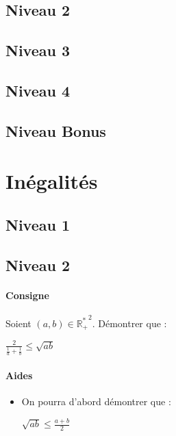 \documentclass[a4paper]{report}
\begin{document}
			\subsection{Niveau 2}
		
			\subsection{Niveau 3}
			
			\subsection{Niveau 4}
			
			\subsection{Niveau Bonus}
	
		\section{Inégalités}	
		
			\subsection{Niveau 1}
		
			\subsection{Niveau 2}
			\begin{tcolorbox}[colback=white,colframe=black,title=Exercice - Inégalités et fractions]
				\paragraph{Consigne}
						Soient $(a,b) \in \mathbb{R_+^*}^2$. Démontrer que :
						\begin{center}
							$\frac{2}{\frac{1}{a} + \frac{1}{b}} \leqslant \sqrt{ab}$
						\end{center}
					
				\tcblower					
					
					\paragraph{Aides}
						\begin{itemize}
							\item On pourra d'abord démontrer que :
							\begin{center}
								$\sqrt{ab} \leqslant \frac{a+b}{2}$					
							\end{center}										
						\end{itemize}	
				\end{tcolorbox}											
		
\end{document}
